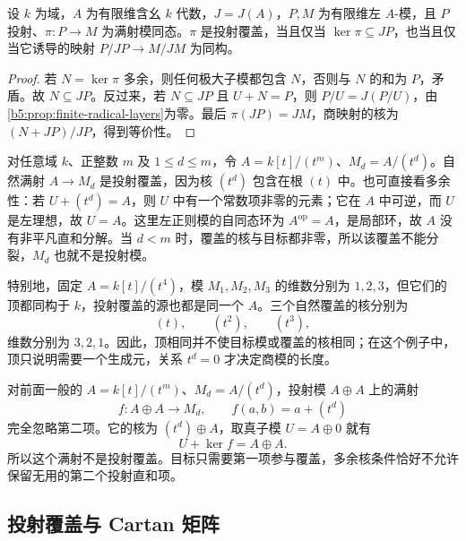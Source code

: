\begin{proposition}\label{b5:prop:projective-cover-top}
	设 \(k\) 为域，\(A\) 为有限维含幺 \(k\) 代数，\(J=J(A)\)，\(P,M\) 为有限维左 \(A\)-模，且 \(P\) 投射、\(\pi:P\to M\) 为满射模同态。\(\pi\) 是投射覆盖，当且仅当 \(\ker\pi\subseteq JP\)，也当且仅当它诱导的映射 \(P/JP\to M/JM\) 为同构。
\end{proposition}
\begin{proof}
	若 \(N=\ker\pi\) 多余，则任何极大子模都包含 \(N\)，否则与 \(N\) 的和为 \(P\)，矛盾。故 \(N\subseteq JP\)。反过来，若 \(N\subseteq JP\) 且 \(U+N=P\)，则 \(P/U=J(P/U)\)，由\cref{b5:prop:finite-radical-layers}为零。最后 \(\pi(JP)=JM\)，商映射的核为 \((N+JP)/JP\)，得到等价性。
\end{proof}
对任意域 \(k\)、正整数 \(m\) 及 \(1\le d\le m\)，令 \(A=k[t]/(t^m)\)、\(M_d=A/(t^d)\)。自然满射 \(A\to M_d\) 是投射覆盖，因为核 \((t^d)\) 包含在根 \((t)\) 中。也可直接看多余性：若 \(U+(t^d)=A\)，则 \(U\) 中有一个常数项非零的元素；它在 \(A\) 中可逆，而 \(U\) 是左理想，故 \(U=A\)。这里左正则模的自同态环为 \(A^{\mathrm{op}}=A\)，是局部环，故 \(A\) 没有非平凡直和分解。当 \(d<m\) 时，覆盖的核与目标都非零，所以该覆盖不能分裂，\(M_d\) 也就不是投射模。

\ProseParagraphBreak

特别地，固定 \(A=k[t]/(t^4)\)，模 \(M_1,M_2,M_3\) 的维数分别为 \(1,2,3\)，但它们的顶都同构于 \(k\)，投射覆盖的源也都是同一个 \(A\)。三个自然覆盖的核分别为
\[
	(t),\qquad (t^2),\qquad (t^3),
\]
维数分别为 \(3,2,1\)。因此，顶相同并不使目标模或覆盖的核相同；在这个例子中，顶只说明需要一个生成元，关系 \(t^d=0\) 才决定商模的长度。

\ProseParagraphBreak

对前面一般的 \(A=k[t]/(t^m)\)、\(M_d=A/(t^d)\)，投射模 \(A\oplus A\) 上的满射
\[
	f:A\oplus A\longrightarrow M_d,\qquad f(a,b)=a+(t^d)
\]
完全忽略第二项。它的核为 \((t^d)\oplus A\)，取真子模 \(U=A\oplus0\) 就有
\[
	U+\ker f=A\oplus A.
\]
所以这个满射不是投射覆盖。目标只需要第一项参与覆盖，多余核条件恰好不允许保留无用的第二个投射直和项。

\subsection{投射覆盖与 Cartan 矩阵}
\label{b5:subsec:0802:02}

